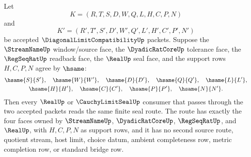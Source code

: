 \begin{theorem}
\label{thm:diagonal-limit-compatibility-four-face-budget-determinacy}
Let
$$
K=(R,T,S,D,W,Q,L,H,C,P,N)
$$
and
$$
K'=(R',T',S',D',W',Q',L',H',C',P',N')
$$
be accepted $\DiagonalLimitCompatibilityUp$ packets. Suppose the
$\StreamNameUp$ window/source face, the $\DyadicRatCoreUp$ tolerance face, the
$\RegSeqRatUp$ readback face, the $\RealUp$ seal face, and the support rows
$H,C,P,N$ agree by $\hsame$:
$$
\begin{gathered}
\hsame{S}{S'},\quad \hsame{W}{W'},\quad \hsame{D}{D'},\quad
\hsame{Q}{Q'},\quad \hsame{L}{L'},\\
\hsame{H}{H'},\quad \hsame{C}{C'},\quad \hsame{P}{P'},\quad
\hsame{N}{N'}.
\end{gathered}
$$
Then every $\RealUp$ or $\CauchyLimitSealUp$ consumer that passes through the
two accepted packets reads the same finite seal route. The route has exactly the
four faces owned by $\StreamNameUp$, $\DyadicRatCoreUp$, $\RegSeqRatUp$, and
$\RealUp$, with $H,C,P,N$ as support rows, and it has no second source route,
quotient stream, host limit, choice datum, ambient completeness row, metric
completion row, or standard bridge row.
\end{theorem}

